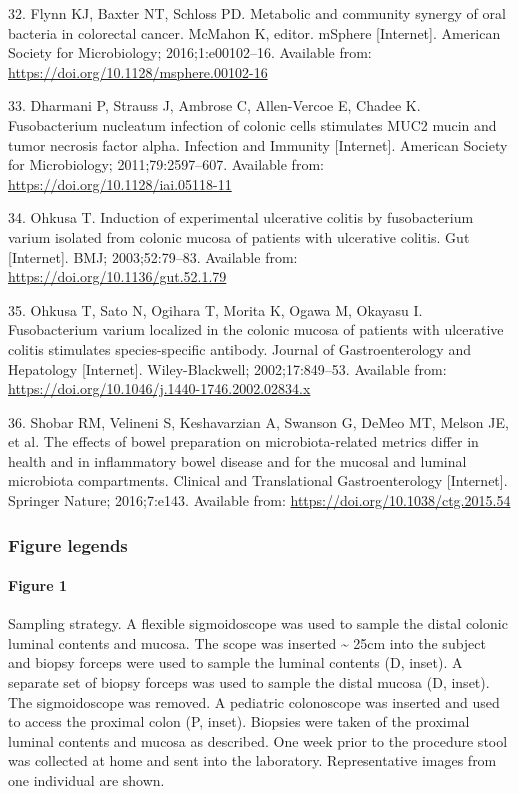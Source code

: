 \documentclass[12pt,]{article}
\let\oldparagraph\paragraph
\renewcommand{\paragraph}[1]{\oldparagraph{#1}\mbox{}}
\begin{document}
\hypertarget{ref-Flynn2016}{}
32. Flynn KJ, Baxter NT, Schloss PD. Metabolic and community synergy of
oral bacteria in colorectal cancer. McMahon K, editor. mSphere
{[}Internet{]}. American Society for Microbiology; 2016;1:e00102--16.
Available from: \url{https://doi.org/10.1128/msphere.00102-16}

\hypertarget{ref-Dharmani2011}{}
33. Dharmani P, Strauss J, Ambrose C, Allen-Vercoe E, Chadee K.
Fusobacterium nucleatum infection of colonic cells stimulates MUC2 mucin
and tumor necrosis factor alpha. Infection and Immunity {[}Internet{]}.
American Society for Microbiology; 2011;79:2597--607. Available from:
\url{https://doi.org/10.1128/iai.05118-11}

\hypertarget{ref-Ohkusa2003}{}
34. Ohkusa T. Induction of experimental ulcerative colitis by
fusobacterium varium isolated from colonic mucosa of patients with
ulcerative colitis. Gut {[}Internet{]}. BMJ; 2003;52:79--83. Available
from: \url{https://doi.org/10.1136/gut.52.1.79}

\hypertarget{ref-Ohkusa2002}{}
35. Ohkusa T, Sato N, Ogihara T, Morita K, Ogawa M, Okayasu I.
Fusobacterium varium localized in the colonic mucosa of patients with
ulcerative colitis stimulates species-specific antibody. Journal of
Gastroenterology and Hepatology {[}Internet{]}. Wiley-Blackwell;
2002;17:849--53. Available from:
\url{https://doi.org/10.1046/j.1440-1746.2002.02834.x}

\hypertarget{ref-Shobar2016}{}
36. Shobar RM, Velineni S, Keshavarzian A, Swanson G, DeMeo MT, Melson
JE, et al. The effects of bowel preparation on microbiota-related
metrics differ in health and in inflammatory bowel disease and for the
mucosal and luminal microbiota compartments. Clinical and Translational
Gastroenterology {[}Internet{]}. Springer Nature; 2016;7:e143. Available
from: \url{https://doi.org/10.1038/ctg.2015.54}

\newpage

\subsubsection{Figure legends}\label{figure-legends}

\paragraph{Figure 1}\label{figure-1}

Sampling strategy. A flexible sigmoidoscope was used to sample the
distal colonic luminal contents and mucosa. The scope was inserted
\textasciitilde{} 25cm into the subject and biopsy forceps were used to
sample the luminal contents (D, inset). A separate set of biopsy forceps
was used to sample the distal mucosa (D, inset). The sigmoidoscope was
removed. A pediatric colonoscope was inserted and used to access the
proximal colon (P, inset). Biopsies were taken of the proximal luminal
contents and mucosa as described. One week prior to the procedure stool
was collected at home and sent into the laboratory. Representative
images from one individual are shown.
\end{document}
